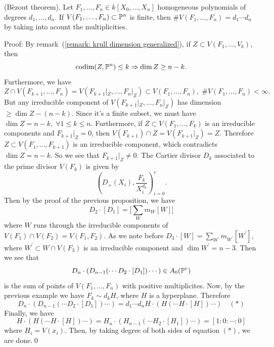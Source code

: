 \begin{dang}
    \begin{theorem}
    (Bèzout theorem). Let $F_1,\dots, F_n\in k[X_0,\dots, X_n]$ homogeneous polynomials 
    of degrees $d_1,\dots, d_n$. If $V(F_1,\dots, F_n)\subset\mathbb{P}^n$ is finite, then 
    $\#V(F_1,\dots, F_n)=d_1\cdots d_n$ by taking into acount the multiplicities.
    \end{theorem}
\end{dang}
Proof: By remark~(\ref{remark: krull dimension generalized}), if $Z\subset V(F_1,\dots, V_k)$, then 
\begin{equation}
    \text{codim}(Z,\mathbb{P}^n)\leq k\Rightarrow \dim Z\geq n-k.
\end{equation} 
Furthermore, we have 
\begin{equation}
    Z\cap V(F_{k+1},\dots, F_n) = V(F_{k+1}|_Z,\dots, F_n|_{Z}) \subset V(F_1,\dots, F_n),\; \#V(F_1,\dots, F_n)<\infty.
\end{equation}
But any irreducible component of $V(F_{k+1}|_Z,\dots, F_n|_{Z})$ has dimension $\geq \dim Z - (n-k)$. Since it's a finite 
subset, we must have $\dim Z = n-k,\;\forall 1\leq k\leq n$. Furthermore, if $Z\subset V(F_1,\dots, F_k)$ is an irreducible components and  
$F_{k+1}|_Z=0$, then $V(F_{k+1})\cap Z=V(F_{k+1}|_Z)=Z$. Therefore
$Z\subset V(F_1,\dots, F_{k+1})$ is an irreducible component, which contradicts $\dim Z = n - k$. 
So we see that $F_{k+1}|_Z\neq 0$. 
The Cartier divisor $D_k$ associated to the prime divisor $V(F_k)$ is given by 
\begin{equation}
    (D_+(X_i),\frac{F_k}{X_i^{d_k}})_{i=0}^r.
\end{equation}
Then by the proof of the previous proposition, we have 
\begin{equation}
    D_2\cdot [ D_1] = \biggl[ \sum_W m_W[W] \biggr]
\end{equation}
where $W$ runs through the irreducible components of $V(F_1)\cap V(F_2)=V(F_1,F_2)$. As we note 
before $D_3\cdot [W] = \sum_{W^\prime}m_{W^\prime}[W^\prime]$, where $W^\prime\subset W\cap V(F_3)$ is an irreducible component 
and $\dim W^\prime = n - 3$. Then we see that 
\begin{equation}
    D_n\cdot(D_{n-1}(\cdots D_2\cdot[D_1])\cdots) \in A_0(\mathbb{P}^r)
\end{equation}
is the sum of points of $V(F_1,\dots, F_n)$ with positive multiplicites. Now, by the previous example we have 
$F_k\sim d_k H$, where $H$ is a hyperplane. Therefore 
\begin{equation}
    D_n\cdot(D_{n-1}(\cdots D_2\cdot[D_1])\cdots) = d_1\cdots d_n H\cdot(H(\cdots H\cdot[H])\cdots)\quad(*)
\end{equation}
Finally, we have 
\begin{equation}
    H\cdot(H(\cdots H\cdot[H])\cdots) = H_n\cdot(H_{n-1}(\cdots H_2\cdot[H_1])\cdots) = [1:0:\cdots:0]
\end{equation}
where $H_i = V(x_i)$. Then, by taking degree of both sides of equation $(*)$, we are done.\qed


